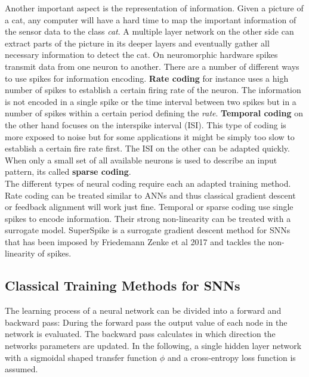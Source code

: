 Another important aspect is the representation of information. Given a picture of a cat, any computer will have a hard time to map the important information of the sensor data to the class \textit{cat}. A multiple layer network on the other side can extract parts of the picture in its deeper layers and eventually gather all necessary information to detect the cat. On neuromorphic hardware spikes transmit data from one neuron to another. There are a number of different ways to use spikes for information encoding. \textbf{Rate coding} for instance uses a high number of spikes to establish a certain firing rate of the neuron. The information is not encoded in a single spike or the time interval between two spikes but in a number of spikes within a certain period defining the \textit{rate}. \textbf{Temporal coding} on the other hand focuses on the interspike interval (ISI). This type of coding is more exposed to noise but for some applications it might be simply too slow to establish a certain fire rate first. The ISI on the other can be adapted quickly. When only a small set of all available neurons is used to describe an input pattern, its called \textbf{sparse coding}.\\

The different types of neural coding require each an adapted training method. Rate coding can be treated similar to ANNs and thus classical gradient descent or feedback alignment will work just fine. Temporal or sparse coding use single spikes to encode information. Their strong non-linearity can be treated with a surrogate model. SuperSpike is a surrogate gradient descent method for SNNs that has been imposed by Friedemann Zenke et al 2017 and tackles the non-linearity of spikes.\\

\subsection{Classical Training Methods for SNNs}

The learning process of a neural network can be divided into a forward and backward pass: During the forward pass the output value of each node in the network is evaluated. The backward pass calculates in which direction the networks parameters are updated. In the following, a single hidden layer network with a sigmoidal shaped transfer function $\phi$ and a cross-entropy loss function is assumed. \\

